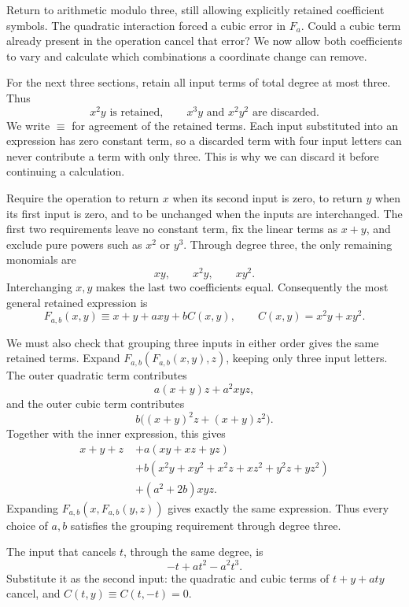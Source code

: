 \documentclass[11pt,letterpaper]{article}
\numberwithin{equation}{section}
\theoremstyle{definition}\newtheorem{example}[theorem]{Example}
\begin{document}
Return to arithmetic modulo three, still allowing explicitly retained coefficient symbols. The quadratic interaction forced a cubic error in \(F_a\). Could a cubic term already present in the operation cancel that error? We now allow both coefficients to vary and calculate which combinations a coordinate change can remove.

For the next three sections, retain all input terms of total degree at most three. Thus
\[
 x^2y\text{ is retained},\qquad
 x^3y\text{ and }x^2y^2\text{ are discarded}.
\]
We write \(\equiv\) for agreement of the retained terms. Each input substituted into an expression has zero constant term, so a discarded term with four input letters can never contribute a term with only three. This is why we can discard it before continuing a calculation.

Require the operation to return \(x\) when its second input is zero, to return \(y\) when its first input is zero, and to be unchanged when the inputs are interchanged. The first two requirements leave no constant term, fix the linear terms as \(x+y\), and exclude pure powers such as \(x^2\) or \(y^3\). Through degree three, the only remaining monomials are
\[
 xy,\qquad x^2y,\qquad xy^2.
\]
Interchanging \(x,y\) makes the last two coefficients equal. Consequently the most general retained expression is
\begin{equation}\label{eq:general-jet}
 F_{a,b}(x,y)\equiv x+y+a xy+bC(x,y),
 \qquad C(x,y)=x^2y+xy^2.
\end{equation}

We must also check that grouping three inputs in either order gives the same retained terms. Expand \(F_{a,b}(F_{a,b}(x,y),z)\), keeping only three input letters. The outer quadratic term contributes
\[
 a(x+y)z+a^2xyz,
\]
and the outer cubic term contributes
\[
 b\bigl((x+y)^2z+(x+y)z^2\bigr).
\]
Together with the inner expression, this gives
\begin{equation}\label{eq:common-cubic-expansion}
 \begin{split}
 x+y+z\;&+a(xy+xz+yz)\\
 &+b(x^2y+xy^2+x^2z+xz^2+y^2z+yz^2)\\
 &+(a^2+2b)xyz.
 \end{split}
\end{equation}
Expanding \(F_{a,b}(x,F_{a,b}(y,z))\) gives exactly the same expression. Thus every choice of \(a,b\) satisfies the grouping requirement through degree three.

The input that cancels \(t\), through the same degree, is
\[
 -t+at^2-a^2t^3.
\]
Substitute it as the second input: the quadratic and cubic terms of \(t+y+a ty\) cancel, and \(C(t,y)\equiv C(t,-t)=0\).
\end{document}
